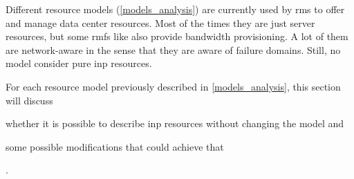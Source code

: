 Different resource models (\autoref{models_analysis}) are currently used by \glspl{rm} to offer and manage data center resources.
Most of the times they are just server resources, but some \glspl{rmf} like \cite{kraken, cloudmirror, oktopus} also provide bandwidth provisioning.
A lot of them are network-aware in the sense that they are aware of failure domains.
Still, no model consider pure \gls{inp} resources.

For each resource model previously described in \autoref{models_analysis}, this section will discuss
\begin{mylist}
    \item whether it is possible to describe \gls{inp} resources without changing the model and
    \item some possible modifications that could achieve that
\end{mylist}.